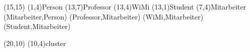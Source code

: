 \documentclass[a4paper,11pt]{article}
\begin{document}
\begin{schema}(15,15)
  \entity(1,4){Person}
  \relation(13,7){Professor}
  \relation(13,4){WiMi}
  \relation(13,1){Student}
  \cluster(7,4){Mitarbeiter}
  \conn(Mitarbeiter,Person){}
  \conn(Professor,Mitarbeiter){}
  \conn(WiMi,Mitarbeiter){}
  \conn(Student,Mitarbeiter){}
\end{schema}

\begin{schema}(20,10)
  \cluster(10,4){cluster}
\end{schema}
\end{document}
